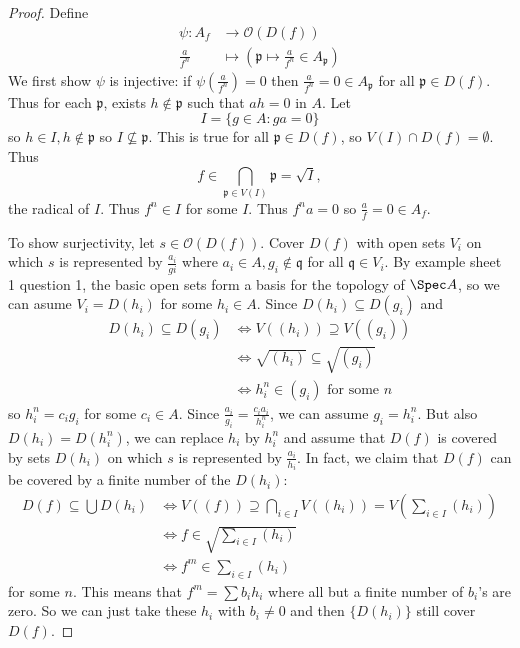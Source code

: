 \documentclass[a4paper]{article}
\newcommand{\sh}[1]{\mathcal{#1}} %
\begin{document}
\begin{proof}
  Define
  \begin{align*}
    \psi: A_f &\to \sh O(D(f)) \\
    \frac{a}{f^n} &\mapsto (\mathfrak p \mapsto \frac{a}{f^n} \in A_{\mathfrak p})
  \end{align*}
  We first show \(\psi\) is injective: if \(\psi(\frac{a}{f^n}) = 0\) then \(\frac{a}{f^n} = 0 \in A_{\mathfrak p}\) for all \(\mathfrak p \in D(f)\). Thus for each \(\mathfrak p\), exists \(h \notin \mathfrak p\) such that \(ah = 0\) in \(A\). Let
  \[
    I = \{g \in A: g a = 0\}
  \]
  so \(h \in I, h \notin \mathfrak p\) so \(I \nsubseteq \mathfrak p\). This is true for all \(\mathfrak p \in D(f)\), so \(V(I) \cap D(f) = \emptyset\). Thus
  \[
    f \in \bigcap_{\mathfrak p \in V(I)} \mathfrak p = \sqrt I,
  \]
  the radical of \(I\). Thus \(f^n \in I\) for some \(I\). Thus \(f^n a = 0\) so \(\frac{a}{f} = 0 \in A_f\).

  To show surjectivity, let \(s \in \sh O(D(f))\). Cover \(D(f)\) with open sets \(V_i\) on which \(s\) is represented by \(\frac{a_i}{gi}\) where \(a_i \in A, g_i \notin \mathfrak q\) for all \(\mathfrak q \in V_i\). By example sheet 1 question 1, the basic open sets form a basis for the topology of \(\Spec A\), so we can asume \(V_i = D(h_i)\) for some \(h_i \in A\). Since \(D(h_i) \subseteq D(g_i)\) and
  \begin{align*}
    D(h_i) \subseteq D(g_i)
    &\iff V((h_i)) \supseteq V((g_i)) \\
    &\iff \sqrt{(h_i)} \subseteq \sqrt{(g_i)} \\
    &\iff h_i^n \in (g_i) \text{ for some } n
  \end{align*}
  so \(h_i^n = c_i g_i\) for some \(c_i \in A\). Since \(\frac{a_i}{g_i} = \frac{c_i a_i}{h_i^n}\), we can assume \(g_i = h_i^n\). But also \(D(h_i) = D(h_i^n)\), we can replace \(h_i\) by \(h_i^n\) and assume that \(D(f)\) is covered by sets \(D(h_i)\) on which \(s\) is represented by \(\frac{a_i}{h_i}\). In fact, we claim that \(D(f)\) can be covered by a finite number of the \(D(h_i)\):
  \begin{align*}
    D(f) \subseteq \bigcup D(h_i)
    &\iff V((f)) \supseteq \bigcap_{i \in I} V((h_i)) = V(\sum_{i \in I} (h_i)) \\
    &\iff f \in \sqrt{\sum_{i \in I} (h_i)} \\
    &\iff f^m \in \sum_{i \in I} (h_i)
  \end{align*}
  for some \(n\). This means that \(f^m = \sum b_i h_i\) where all but a finite number of \(b_i\)'s are zero. So we can just take these \(h_i\) with \(b_i \neq 0\) and then \(\{D(h_i)\}\) still cover \(D(f)\).


\end{proof}
\end{document}
